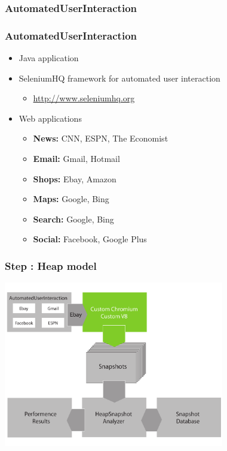 \subsubsection{AutomatedUserInteraction}
\begin{frame}
	\frametitle{AutomatedUserInteraction}
	\begin{itemize}
		\item Java application
		\item SeleniumHQ framework for automated user interaction
		\begin{itemize}
			\item \href{http://www.seleniumhq.org/}{http://www.seleniumhq.org}
		\end{itemize}
		\item Web applications
		\begin{itemize}
			\item \textbf{News:} CNN, ESPN, The Economist
			\item \textbf{Email:} Gmail, Hotmail
			\item \textbf{Shops:} Ebay, Amazon
			\item \textbf{Maps:} Google, Bing
			\item \textbf{Search:} Google, Bing
			\item \textbf{Social:} Facebook, Google Plus
		\end{itemize}
	\end{itemize}
\end{frame}
	
\begin{frame}
	\frametitle{Step \theStepCounter: Heap model}		
	\includegraphics[width=26em]{../imgs/solution_h_2.pdf}
\end{frame}


